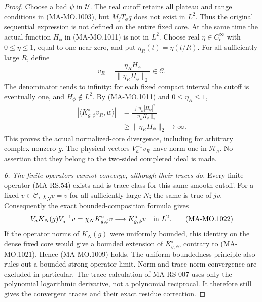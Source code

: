 \begin{proof}
Choose a bad \(\psi\) in \(\mathscr U\).
The real cutoff retains all plateau and range
conditions in (MA-MO.1003), but \(M_jT_\phi q\)
does not exist in \(L^2\).  Thus the original
sequential expression is not defined on the
entire fixed core.  At the same time
the actual function \(H_\phi\) in
(MA-MO.1011) is not in \(L^2\).
Choose real \(\eta\in C_c^\infty\) with
\(0\le\eta\le1\), equal to one near zero,
and put \(\eta_R(t)=\eta(t/R)\).  For all
sufficiently large \(R\), define
\[
 v_R=\frac{\eta_R H_\phi}{\|\eta_R H_\phi\|_2}
                                      \in\mathscr C.
\tag{MA-MO.1020}
\]
The denominator tends to infinity: for each
fixed compact interval the cutoff is eventually
one, and \(H_\phi\notin L^2\).
By (MA-MO.1011) and \(0\le\eta_R\le1\),
\[
 \begin{split}
 |\langle K^\circ_{g,\phi}v_R,w\rangle|
 &=\frac{\int\eta_R|H_\phi|^2}
              {\|\eta_R H_\phi\|_2}\\
 &\ge\|\eta_R H_\phi\|_2\longrightarrow\infty .
 \end{split}
\tag{MA-MO.1021}
\]
This proves the actual normalized-core divergence,
including for arbitrary complex nonzero \(g\).
The physical vectors \(V_a^{-1}v_R\) have norm
one in \(\mathcal H_a\).  No assertion that
they belong to the two-sided completed ideal
is made.

\emph{6. The finite operators cannot converge,
although their traces do.}
Every finite operator (MA-RS.54) exists and is
trace class for this same smooth cutoff.  For
a fixed \(v\in\mathscr C\), \(\chi_Nv=v\)
for all sufficiently large \(N\); the same
is true of \(jv\).  Consequently the exact
bounded-composition formula gives
\[
 V_aK_N(g)V_a^{-1}v
        =\chi_NK^\circ_{g,\phi}v
                 \longrightarrow K^\circ_{g,\phi}v
                                      \quad\hbox{in }L^2 .
\tag{MA-MO.1022}
\]
If the operator norms of \(K_N(g)\) were
uniformly bounded, this identity on the
dense fixed core would give a bounded
extension of \(K^\circ_{g,\phi}\), contrary
to (MA-MO.1021).  Hence (MA-MO.1009) holds.
The uniform boundedness principle also rules
out a bounded strong operator limit.
Norm and trace-norm convergence are excluded
in particular.  The trace calculation of
MA-RS-007 uses only the polynomial logarithmic
derivative, not a polynomial reciprocal.
It therefore still gives the convergent
traces and their exact residue correction.
\end{proof}

